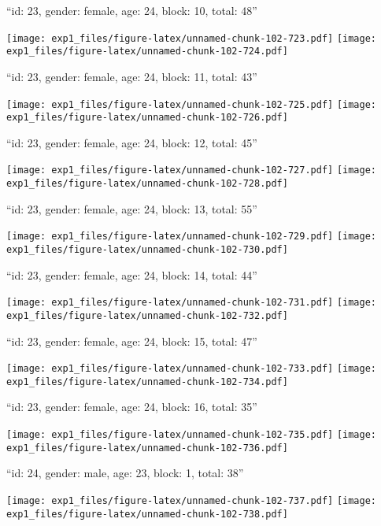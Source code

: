 \documentclass[11pt,,]{article}
\begin{document}
\newpage
[1] 

``id: 23, gender: female, age: 24, block: 10, total: 48''

\texttt{[image: exp1\_files/figure-latex/unnamed-chunk-102-723.pdf]}
\texttt{[image: exp1\_files/figure-latex/unnamed-chunk-102-724.pdf]}

\newpage
[1] 

``id: 23, gender: female, age: 24, block: 11, total: 43''

\texttt{[image: exp1\_files/figure-latex/unnamed-chunk-102-725.pdf]}
\texttt{[image: exp1\_files/figure-latex/unnamed-chunk-102-726.pdf]}

\newpage
[1] 

``id: 23, gender: female, age: 24, block: 12, total: 45''

\texttt{[image: exp1\_files/figure-latex/unnamed-chunk-102-727.pdf]}
\texttt{[image: exp1\_files/figure-latex/unnamed-chunk-102-728.pdf]}

\newpage
[1] 

``id: 23, gender: female, age: 24, block: 13, total: 55''

\texttt{[image: exp1\_files/figure-latex/unnamed-chunk-102-729.pdf]}
\texttt{[image: exp1\_files/figure-latex/unnamed-chunk-102-730.pdf]}

\newpage
[1] 

``id: 23, gender: female, age: 24, block: 14, total: 44''

\texttt{[image: exp1\_files/figure-latex/unnamed-chunk-102-731.pdf]}
\texttt{[image: exp1\_files/figure-latex/unnamed-chunk-102-732.pdf]}

\newpage
[1] 

``id: 23, gender: female, age: 24, block: 15, total: 47''

\texttt{[image: exp1\_files/figure-latex/unnamed-chunk-102-733.pdf]}
\texttt{[image: exp1\_files/figure-latex/unnamed-chunk-102-734.pdf]}

\newpage
[1] 

``id: 23, gender: female, age: 24, block: 16, total: 35''

\texttt{[image: exp1\_files/figure-latex/unnamed-chunk-102-735.pdf]}
\texttt{[image: exp1\_files/figure-latex/unnamed-chunk-102-736.pdf]}

\newpage
[1] 

``id: 24, gender: male, age: 23, block: 1, total: 38''

\texttt{[image: exp1\_files/figure-latex/unnamed-chunk-102-737.pdf]}
\texttt{[image: exp1\_files/figure-latex/unnamed-chunk-102-738.pdf]}
\end{document}
